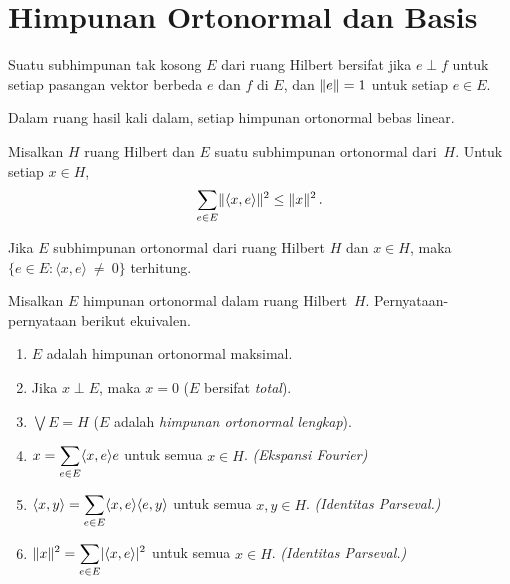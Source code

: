 \section{Himpunan Ortonormal dan Basis}\label{sec_onbases}
\begin{defn} Suatu subhimpunan tak kosong $E$ dari ruang Hilbert bersifat
 jika $e \perp f$ untuk setiap pasangan vektor berbeda $e$ dan $f$ di $E$, dan
$\lVert e\rVert = 1$ untuk setiap $e \in E$.
\end{defn}

\begin{prop} Dalam ruang hasil kali dalam, setiap himpunan ortonormal bebas linear.
\end{prop}

\begin{prop}\label{C063141} Misalkan $H$ ruang Hilbert dan $E$ suatu
subhimpunan ortonormal dari~$H$. Untuk setiap $x \in H$,
  \[ \sum_{e \in E} \lVert\langle x,e \rangle\rVert^2 \le \lVert x\rVert^2\,. \]
\end{prop}

\begin{cor} Jika $E$ subhimpunan ortonormal dari ruang Hilbert $H$ dan $x \in H$, maka
$\{e \in E\colon \langle x,e \rangle~\ne~0\}$ terhitung.
\end{cor}

\begin{prop}\label{C063144} Misalkan $E$ himpunan ortonormal dalam ruang Hilbert~$H$. Pernyataan-pernyataan
berikut ekuivalen.
 \begin{enumerate}
  \item $E$ adalah himpunan ortonormal maksimal.
  \item Jika $x \perp E$, maka $x = 0$ ($E$ bersifat \emph{total}).
  \item $\bigvee E = H$ ($E$ adalah \emph{himpunan ortonormal lengkap}).
  \item $\displaystyle x = \sum_{e \in E} \langle x,e \rangle e$ untuk semua $x \in H$. \emph{(Ekspansi
Fourier)}
  \item $\displaystyle \langle x,y \rangle = \sum_{e \in E} \langle x,e \rangle \langle e,y \rangle$
untuk semua $x,y \in H$. \emph{(Identitas Parseval.)}
  \item $\displaystyle \lVert x\rVert^2 = \sum_{e \in E} \lvert\langle x,e \rangle\rvert^2$ untuk semua $x \in H$.
\emph{(Identitas Parseval.)}
 \end{enumerate}
\end{prop}

